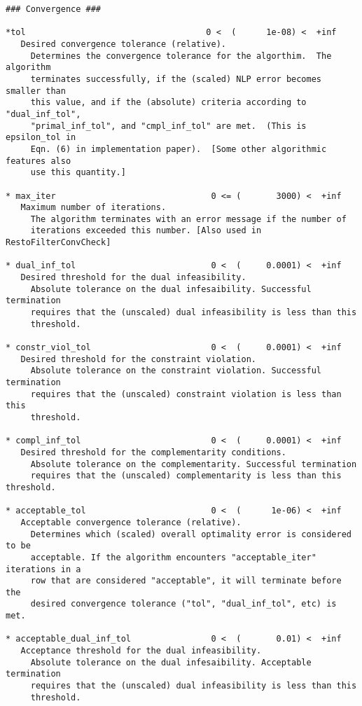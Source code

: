 \documentclass[letter,10pt]{article}
\begin{document}
{\begin{verbatim}
### Convergence ###

*tol                                    0 <  (      1e-08) <  +inf      
   Desired convergence tolerance (relative).
     Determines the convergence tolerance for the algorthim.  The algorithm
     terminates successfully, if the (scaled) NLP error becomes smaller than
     this value, and if the (absolute) criteria according to "dual_inf_tol",
     "primal_inf_tol", and "cmpl_inf_tol" are met.  (This is epsilon_tol in
     Eqn. (6) in implementation paper).  [Some other algorithmic features also
     use this quantity.]

* max_iter                               0 <= (       3000) <  +inf      
   Maximum number of iterations.
     The algorithm terminates with an error message if the number of
     iterations exceeded this number. [Also used in RestoFilterConvCheck]

* dual_inf_tol                           0 <  (     0.0001) <  +inf      
   Desired threshold for the dual infeasibility.
     Absolute tolerance on the dual infesaibility. Successful termination
     requires that the (unscaled) dual infeasibility is less than this
     threshold.

* constr_viol_tol                        0 <  (     0.0001) <  +inf      
   Desired threshold for the constraint violation.
     Absolute tolerance on the constraint violation. Successful termination
     requires that the (unscaled) constraint violation is less than this
     threshold.

* compl_inf_tol                          0 <  (     0.0001) <  +inf      
   Desired threshold for the complementarity conditions.
     Absolute tolerance on the complementarity. Successful termination
     requires that the (unscaled) complementarity is less than this threshold.

* acceptable_tol                         0 <  (      1e-06) <  +inf      
   Acceptable convergence tolerance (relative).
     Determines which (scaled) overall optimality error is considered to be
     acceptable. If the algorithm encounters "acceptable_iter" iterations in a
     row that are considered "acceptable", it will terminate before the
     desired convergence tolerance ("tol", "dual_inf_tol", etc) is met.

* acceptable_dual_inf_tol                0 <  (       0.01) <  +inf      
   Acceptance threshold for the dual infeasibility.
     Absolute tolerance on the dual infesaibility. Acceptable termination
     requires that the (unscaled) dual infeasibility is less than this
     threshold.


\end{verbatim}}
\end{document}
